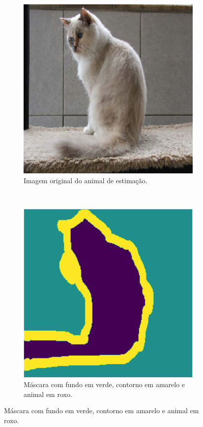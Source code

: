 \begin{figure}[H]
   \centering
   \caption{Exemplo de amostra com mascara de características.}
   \label{project:fig:dataset:pets_1}
    \begin{subfigure}[t]{0.5\textwidth}
        \centering
        \includegraphics[width=1\linewidth]{recursos/imagens/project/pets_ori.png}
        \caption{Imagem original do animal de estimação.}
        \label{project:fig:dataset:pets_1.1}
    \end{subfigure}%
    ~ 
    \begin{subfigure}[t]{0.5\textwidth}
        \centering
        \includegraphics[width=1\linewidth]{recursos/imagens/project/pets_mask.png}
        \caption{Máscara com fundo em verde, contorno em amarelo e animal em roxo.}
        \label{project:fig:dataset:pets_1.2}
    \end{subfigure}%


\end{figure}
